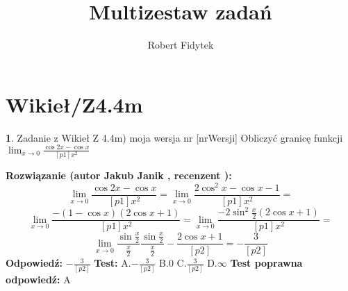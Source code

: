 \documentclass[12pt, a4paper]{article}
\title{Multizestaw zadań}
\author{Robert Fidytek}
\date{}
\theoremstyle{definition} %
\newtheorem{zad}{}
\newcommand{\kategoria}[1]{\section{#1}} %
\newcommand{\zadStart}[1]{\begin{zad}#1\newline} %
\newcommand{\zadStop}{\end{zad}}   %
\newcommand{\rozwStart}[2]{\noindent \textbf{Rozwiązanie (autor #1 , recenzent #2): }\newline} %
\newcommand{\rozwStop}{\newline}                                            %
\newcommand{\odpStart}{\noindent \textbf{Odpowiedź:}\newline}    %
\newcommand{\odpStop}{\newline}                                             %
\newcommand{\testStart}{\noindent \textbf{Test:}\newline} %
\newcommand{\testStop}{\newline} %
\newcommand{\kluczStart}{\noindent \textbf{Test poprawna odpowiedź:}\newline} %
\newcommand{\kluczStop}{\newline} %
\begin{document}
\maketitle


\kategoria{Wikieł/Z4.4m}
\zadStart{Zadanie z Wikieł Z 4.4m) moja wersja nr [nrWersji]}
Obliczyć granicę funkcji $\lim_{x \to 0} \frac{\cos{2x}-\cos{x}}{[p1]x^2}$
\zadStop
\rozwStart{Jakub Janik}{}
$$\lim_{x \to 0} \frac{\cos{2x}-\cos{x}}{[p1]x^2}=\lim_{x \to 0} \frac{2\cos^2{x}-\cos{x}-1}{[p1]x^2}=$$
$$\lim_{x \to 0} \frac{-(1-\cos{x})(2\cos{x}+1)}{[p1]x^2}=\lim_{x \to 0} \frac{-2\sin^2{\frac{x}{2}}(2\cos{x}+1)}{[p1]x^2}=$$
$$\lim_{x \to 0} \frac{\sin{\frac{x}{2}}}{\frac{x}{2}}\frac{\sin{\frac{x}{2}}}{\frac{x}{2}}-\frac{2\cos{x}+1}{[p2]}=-\frac{3}{[p2]}$$
\rozwStop
\odpStart
$-\frac{3}{[p2]}$
\odpStop
\testStart
A.$-\frac{3}{[p2]}$
B.$0$
C.$\frac{3}{[p2]}$
D.$\infty$
\testStop
\kluczStart
A
\kluczStop
\end{document}
